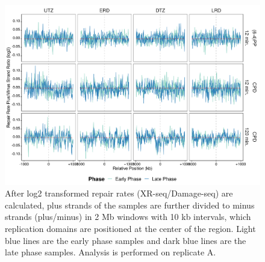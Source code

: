 \begin{figure}[H]
\begin{center}
\includegraphics[width=\textwidth]{Chapters/7_appendix/figures/supfig34}
\caption[Repair rate plus/minus phase ratio of replication domains in 2 Mb (replicate A).]{After log2 transformed repair rates (XR-seq/Damage-seq) are calculated, plus strands of the samples are further divided to minus strands (plus/minus) in 2 Mb windows with 10 kb intervals, which replication domains are positioned at the center of the region. Light blue lines are the early phase samples and dark blue lines are the late phase samples. Analysis is performed on replicate A.}
\label{supfig:rrpm2000repdomainA}
\end{center}
\end{figure}

